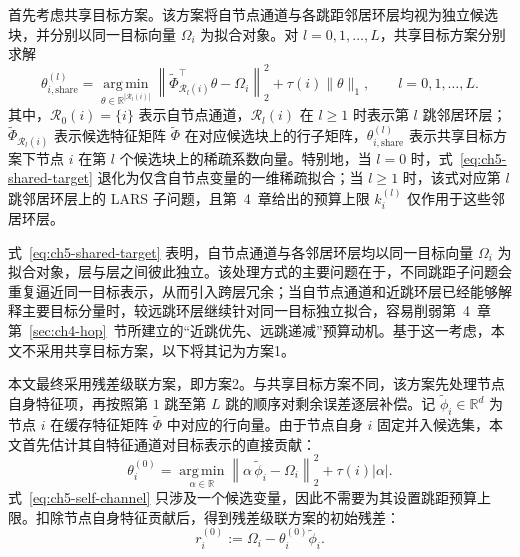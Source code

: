 首先考虑共享目标方案。该方案将自节点通道与各跳距邻居环层均视为独立候选块，并分别以同一目标向量 \(\Omega_i\) 为拟合对象。对 \(l=0,1,\dots,L\)，共享目标方案分别求解
\begin{equation}
  \theta_{i,\mathrm{share}}^{(l)}
  =
  \operatorname*{arg\,min}_{\theta\in\mathbb{R}^{|\mathcal{R}_l(i)|}}
  \left\|
  \tilde{\Phi}_{\mathcal{R}_l(i)}^{\top}\theta-\Omega_i
  \right\|_2^2
  +
  \tau(i)\|\theta\|_1,
  \qquad l=0,1,\dots,L.
  \label{eq:ch5-shared-target}
\end{equation}
其中，\(\mathcal{R}_0(i)=\{i\}\) 表示自节点通道，\(\mathcal{R}_l(i)\) 在 \(l\geq 1\) 时表示第 \(l\) 跳邻居环层；\(\tilde{\Phi}_{\mathcal{R}_l(i)}\) 表示候选特征矩阵 \(\tilde{\Phi}\) 在对应候选块上的行子矩阵，\(\theta_{i,\mathrm{share}}^{(l)}\) 表示共享目标方案下节点 \(i\) 在第 \(l\) 个候选块上的稀疏系数向量。特别地，当 \(l=0\) 时，式~\eqref{eq:ch5-shared-target} 退化为仅含自节点变量的一维稀疏拟合；当 \(l\geq 1\) 时，该式对应第 \(l\) 跳邻居环层上的 LARS 子问题，且第~4~章给出的预算上限 \(k_i^{(l)}\) 仅作用于这些邻居环层。

式~\eqref{eq:ch5-shared-target} 表明，自节点通道与各邻居环层均以同一目标向量 \(\Omega_i\) 为拟合对象，层与层之间彼此独立。该处理方式的主要问题在于，不同跳距子问题会重复逼近同一目标表示，从而引入跨层冗余；当自节点通道和近跳环层已经能够解释主要目标分量时，较远跳环层继续针对同一目标独立拟合，容易削弱第~4~章第~\ref{sec:ch4-hop}~节所建立的“近跳优先、远跳递减”预算动机。基于这一考虑，本文不采用共享目标方案，以下将其记为方案1。

本文最终采用残差级联方案，即方案2。与共享目标方案不同，该方案先处理节点自身特征项，再按照第 \(1\) 跳至第 \(L\) 跳的顺序对剩余误差逐层补偿。记 \(\tilde{\phi}_i\in\mathbb{R}^{d}\) 为节点 \(i\) 在缓存特征矩阵 \(\tilde{\Phi}\) 中对应的行向量。由于节点自身 \(i\) 固定并入候选集，本文首先估计其自特征通道对目标表示的直接贡献：
\begin{equation}
  \theta_i^{(0)}
  =
  \operatorname*{arg\,min}_{\alpha\in\mathbb{R}}
  \left\|
  \alpha\,\tilde{\phi}_i-\Omega_i
  \right\|_2^2
  +
  \tau(i)|\alpha|.
  \label{eq:ch5-self-channel}
\end{equation}
式~\eqref{eq:ch5-self-channel} 只涉及一个候选变量，因此不需要为其设置跳距预算上限。扣除节点自身特征贡献后，得到残差级联方案的初始残差：
\begin{equation}
  r_i^{(0)}
  :=
  \Omega_i-\theta_i^{(0)}\tilde{\phi}_i.
  \label{eq:ch5-initial-residual}
\end{equation}

